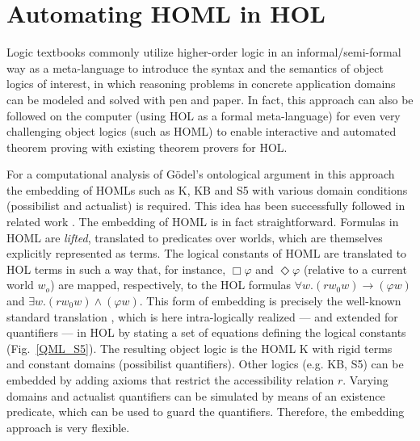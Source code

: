 \documentclass{article}
\newcommand{\imp}{{\rightarrow}}
\begin{document}








\section{Automating HOML in HOL}\label{sec:homlinhol}

Logic textbooks %
commonly utilize higher-order logic in an informal/semi-formal way as
a meta-language to introduce the syntax and the semantics of object
logics of interest, in which reasoning problems in concrete
application domains can be modeled and solved with pen and paper. In
fact, this approach can also be followed on the computer (using HOL as
a formal meta-language) for even very challenging object logics (such
as HOML) to enable interactive and automated theorem proving with
existing theorem provers for HOL.


For a computational analysis of G\"odel's ontological argument in this
approach the embedding of HOMLs such as K,
KB and S5 with various domain conditions (possibilist and actualist)
is required. This idea has been successfully followed in related work
\cite{C40}. The embedding of HOML is in fact
straightforward. Formulas in HOML are \emph{lifted}, translated to predicates
over worlds, which are themselves explicitly represented as
terms. The logical constants of HOML are translated to HOL terms in such a way that, for instance, 
$\Box \varphi$ and $\Diamond \varphi$ (relative to a current world
$w_o$) are mapped, respectively, to the HOL formulas
$\forall w. (r w_0 w) \imp (\varphi w)$ and
$\exists w. (r w_0 w) \wedge (\varphi w)$. This form of embedding is
precisely the well-known standard translation
\cite{DBLP:journals/logcom/Ohlbach91}, which is here intra-logically
realized --- and extended for quantifiers --- in HOL by stating a set
of equations defining the logical constants (Fig.~\ref{QML_S5}). The
resulting object logic is the HOML K with rigid terms and constant
domains (possibilist quantifiers). Other logics (e.g. KB, S5) can be
embedded by adding axioms that restrict the accessibility relation
$r$. Varying domains and actualist quantifiers can be simulated by
means of an existence predicate, which can be used to guard the
quantifiers. Therefore, the embedding approach is very flexible.
\end{document}
